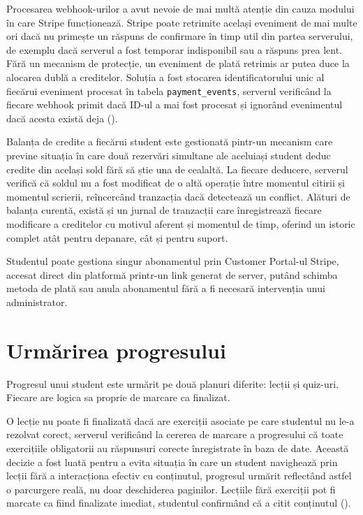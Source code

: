 Procesarea webhook-urilor a avut nevoie de mai multă atenție din cauza modului în care Stripe funcționează. Stripe poate retrimite același eveniment de mai multe ori dacă nu primește un răspuns de confirmare în timp util din partea serverului, de exemplu dacă serverul a fost temporar indisponibil sau a răspuns prea lent. Fără un mecanism de protecție, un eveniment de plată retrimis ar putea duce la alocarea dublă a creditelor. Soluția a fost stocarea identificatorului unic al fiecărui eveniment procesat în tabela \texttt{payment\_events}, serverul verificând la fiecare webhook primit dacă ID-ul a mai fost procesat și ignorând evenimentul dacă acesta există deja ().

Balanța de credite a fiecărui student este gestionată pintr-un mecanism care previne situația în care două rezervări simultane ale aceluiași student deduc credite din același sold fără să știe una de cealaltă. La fiecare deducere, serverul verifică că soldul nu a fost modificat de o altă operație între momentul citirii și momentul scrierii, reîncercând tranzacția dacă detectează un conflict. Alături de balanța curentă, există și un jurnal de tranzacții care înregistrează fiecare modificare a creditelor cu motivul aferent și momentul de timp, oferind un istoric complet atât pentru depanare, cât și pentru suport.

Studentul poate gestiona singur abonamentul prin Customer Portal-ul Stripe, accesat direct din platformă printr-un link generat de server, putând schimba metoda de plată sau anula abonamentul fără a fi necesară intervenția unui administrator.

\section{Urmărirea progresului}
Progresul unui student este urmărit pe două planuri diferite: lecții și quiz-uri. Fiecare are logica sa proprie de marcare ca finalizat.

O lecție nu poate fi finalizată dacă are exerciții asociate pe care studentul nu le-a rezolvat corect, serverul verificând la cererea de marcare a progresului că toate exercițiile obligatorii au răspunsuri corecte înregistrate în baza de date. Această decizie a fost luată pentru a evita situația în care un student navighează prin lecții fără a interacționa efectiv cu conținutul, progresul urmărit reflectând astfel o parcurgere reală, nu doar deschiderea paginilor. Lecțiile fără exerciții pot fi marcate ca fiind finalizate imediat, studentul confirmând că a citit conținutul ().

